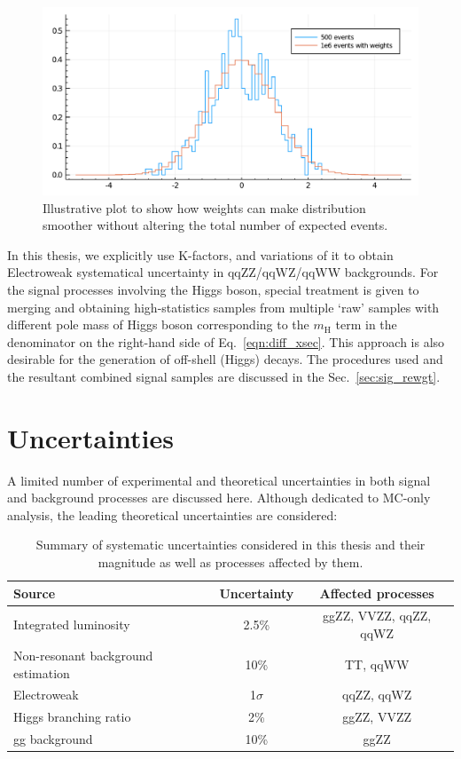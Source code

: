 \begin{figure}[hb]
\begin{center}
\includegraphics[width=.8\linewidth]{fig/demo_wgts.pdf}
\end{center}
\caption{Illustrative plot to show how weights can make distribution smoother without altering
the total number of expected events.}
\label{fig:wgt_demo}
\end{figure}

In this thesis, we explicitly use K-factors, and variations of it to 
obtain Electroweak systematical uncertainty in qqZZ/qqWZ/qqWW backgrounds. For the signal processes involving
the Higgs boson, special treatment is given to merging and obtaining high-statistics samples from
multiple `raw' samples with different pole mass of Higgs boson corresponding to the $m_\mathrm{H}$ term
in the denominator on the right-hand side of Eq.~\ref{eqn:diff_xsec}.
This approach is also desirable for the generation of off-shell (Higgs) decays. The procedures 
used and the resultant combined signal samples are discussed in the Sec.~\ref{sec:sig_rewgt}.

\section{Uncertainties}
A limited number of experimental and theoretical uncertainties in both signal and background
processes are discussed here. Although dedicated to MC-only analysis, the leading theoretical
uncertainties are considered:
\begin{table}[hbt]
    \label{tab:uncertainty}
    \centering
\begin{tabular}{lcc}
\hline
Source                             & Uncertainty            & Affected processes \\ \hline
Integrated luminosity              & 2.5\%                  & ggZZ, VVZZ, qqZZ, qqWZ \\
Non-resonant background estimation & 10\%                   & TT, qqWW           \\
Electroweak                       & 1$\sigma$ & qqZZ, qqWZ         \\
Higgs branching ratio              & 2\%                    & ggZZ, VVZZ           \\
gg background              & 10\%                   & ggZZ
\end{tabular}
\caption{Summary of systematic uncertainties considered in this thesis and their
magnitude as well as processes affected by them.}
\label{tab:systs}
\end{table}

